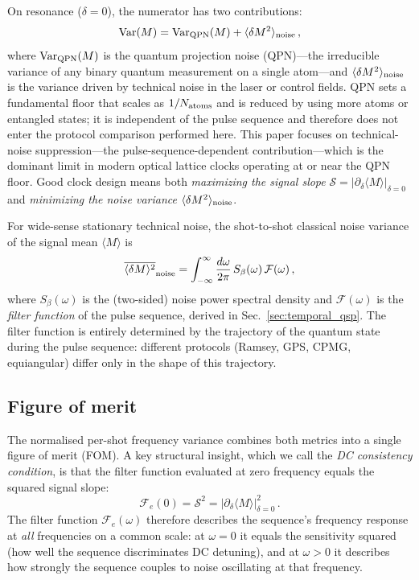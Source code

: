 \documentclass[aps,pra,twocolumn,superscriptaddress,longbibliography]{revtex4-2}
\newcommand{\be}{\begin{equation}}
\newcommand{\ee}{\end{equation}}
\begin{document}
On resonance ($\delta = 0$), the numerator has two contributions:
\be
  \mathrm{Var}(M) = \mathrm{Var}_{\rm QPN}(M) + \langle \delta M^2 \rangle_{\rm noise}\,,
  \label{eq:var_total}
\ee
where $\mathrm{Var}_{\rm QPN}(M)$ is the quantum projection noise (QPN)---the irreducible
variance of any binary quantum measurement on a single atom---and
$\langle \delta M^2 \rangle_{\rm noise}$ is the variance driven by technical noise in
the laser or control fields.
QPN sets a fundamental floor that scales as $1/N_{\rm atoms}$ and is reduced by using
more atoms or entangled states; it is independent of the pulse sequence and therefore
does not enter the protocol comparison performed here.
This paper focuses on technical-noise suppression---the pulse-sequence-dependent
contribution---which is the dominant limit in modern optical lattice clocks operating
at or near the QPN floor.
Good clock design means both \emph{maximizing the signal slope}
$\mathcal{S} = |\partial_\delta\langle M\rangle|_{\delta=0}$ and
\emph{minimizing the noise variance} $\langle\delta M^2\rangle_{\rm noise}$.

For wide-sense stationary technical noise, the shot-to-shot classical noise variance of the
signal mean $\langle M\rangle$ is
\be
  \overline{\langle \delta M \rangle^2}_{\rm noise} = \int_{-\infty}^{\infty}
    \frac{d\omega}{2\pi}\, S_\beta(\omega)\, \mathcal{F}(\omega)\,,
  \label{eq:noise_var_general}
\ee
where $S_\beta(\omega)$ is the (two-sided) noise power spectral density and $\mathcal{F}(\omega)$
is the \emph{filter function} of the pulse sequence, derived in Sec.~\ref{sec:temporal_qsp}.
The filter function is entirely determined by the trajectory of the quantum state during
the pulse sequence: different protocols (Ramsey, GPS, CPMG, equiangular) differ only in
the shape of this trajectory.

\subsection{Figure of merit}
\label{sec:fom}

The normalised per-shot frequency variance combines both metrics into a single
figure of merit (FOM).
A key structural insight, which we call the \emph{DC consistency condition},
is that the filter function evaluated at zero frequency equals the squared signal slope:
\be
  \mathcal{F}_e(0) = \mathcal{S}^2 = |\partial_\delta\langle M\rangle|^2_{\delta=0}\,.
  \label{eq:dc_consistency}
\ee
The filter function $\mathcal{F}_e(\omega)$ therefore describes the sequence's
frequency response at \emph{all} frequencies on a common scale: at $\omega=0$ it
equals the sensitivity squared (how well the sequence discriminates DC detuning),
and at $\omega > 0$ it describes how strongly the sequence couples to noise
oscillating at that frequency.
\end{document}

